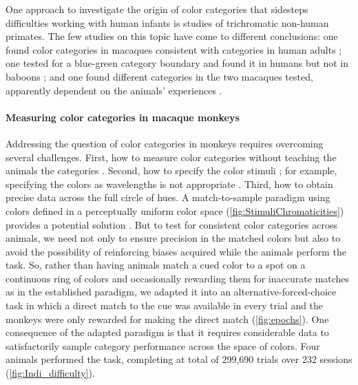One approach to investigate the origin of color categories that sidesteps difficulties working with human infants is studies of trichromatic non-human primates. 
The few studies on this topic have come to different conclusions: one found color categories in macaques consistent with categories in human adults \citep{sandell_color_1979}; one tested for a blue-green category boundary and found it in humans but not in baboons \citep{fagot_cross-species_2006}; and one found different categories in the two macaques tested, apparently dependent on the animals’ experiences \citep{panichello_error-correcting_2019}.

\paragraph{Measuring color categories in macaque monkeys}

Addressing the question of color categories in monkeys requires overcoming several challenges. 
First, how to measure color categories without teaching the animals the categories \citep{essock_color_1977,matsuno_color_2004}.
Second, how to specify the color stimuli \citep{siuda-krzywicka_biological_2019}; for example, specifying the colors as wavelengths \citep{sandell_color_1979}
is not appropriate \citep{davidoff_cross-species_2010}. 
Third, how to obtain precise data across the full circle of hues. 
A match-to-sample paradigm using colors defined in a perceptually uniform color space (\autoref{fig:StimuliChromaticities}) provides a potential solution \citep{bae_why_2015,panichello_error-correcting_2019}.
But to test for consistent color categories across animals, we need not only to ensure precision in the matched colors but also to avoid the possibility of reinforcing biases acquired while the animals perform the task. 
So, rather than having animals match a cued color to a spot on a continuous ring of colors and occasionally rewarding them for inaccurate matches as in the established paradigm, we adapted it into an alternative-forced-choice task in which a direct match to the cue was available in every trial and the monkeys were only rewarded for making the direct match (\autoref{fig:epochs}). 
One consequence of the adapted paradigm is that it requires considerable data to satisfactorily sample category performance across the space of colors. 
Four animals performed the task, completing at total of 299,690 trials over 232 sessions (\autoref{fig:Indi_difficulty}).

